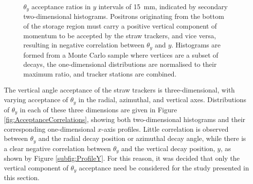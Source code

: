 \begin{figure}[t!]
\hfill
{}
\caption{$\theta_{y}$ acceptance ratios in $y$ intervals of \SI{15}{\milli\metre}, indicated by secondary two-dimensional histograms. Positrons originating from the bottom of the storage region must carry a positive vertical component of momentum to be accepted by the straw trackers, and vice versa, resulting in negative correlation between $\theta_{y}$ and $y$. Histograms are formed from a Monte Carlo sample where vertices are a subset of decays, the one-dimensional distributions are normalised to their maximum ratio, and tracker stations are combined.} 
\label{fig:1DAcceptanceRatios}
\end{figure} 

The vertical angle acceptance of the straw trackers is three-dimensional, with varying acceptance of $\theta_{y}$ in the radial, azimuthal, and vertical axes. Distributions of $\theta_{y}$ in each of these three dimensions are given in Figure \ref{fig:AcceptanceCorrelations}, showing both two-dimensional histograms and their corresponding one-dimensional $x$-axis profiles. Little correlation is observed between $\theta_{y}$ and the radial decay position or azimuthal decay angle, while there is a clear negative correlation between $\theta_{y}$ and the vertical decay position, $y$, as shown by Figure \ref{subfig:ProfileY}. For this reason, it was decided that only the vertical component of $\theta_{y}$ acceptance need be considered for the study presented in this section.






